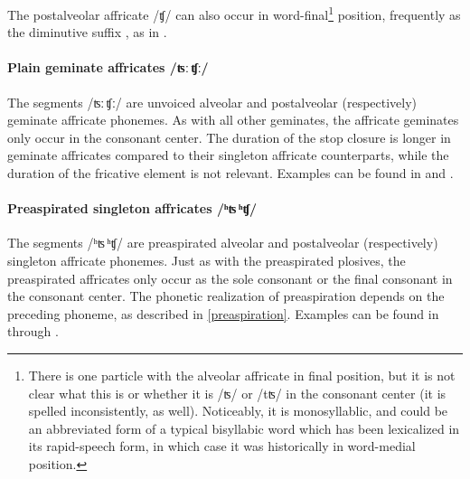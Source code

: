 The postalveolar affricate /ʧ/ can also occur in word-final\footnote{There is one particle  with the alveolar affricate in final position, but it is not clear what this is or whether it is /ʦ/ or /tʦ/ in the consonant center (it is spelled inconsistently, as well). Noticeably, it is monosyllablic, and could be an abbreviated form of a typical bisyllabic word which has been lexicalized in its rapid-speech form, in which case it was historically in word-medial position.} %
position, frequently as the diminutive suffix , as in .

\paragraph{Plain geminate affricates /ʦː\,ʧː/}
The segments /ʦː\,ʧː/ are unvoiced alveolar and postalveolar (respectively) geminate affricate phonemes. As with all other geminates, the affricate geminates only occur in the consonant center. The duration of the stop closure is longer in geminate affricates compared to their singleton affricate counterparts, while the duration of the fricative element is not relevant.
Examples can be found in  and .

\paragraph{Preaspirated singleton affricates /ʰʦ\,ʰʧ/}
The segments \mbox{/ʰʦ\,ʰʧ/} are preaspirated alveolar and postalveolar (respectively) singleton affricate phonemes. Just as with the preaspirated plosives, the preaspirated affricates only occur as the sole consonant or the final consonant in the consonant center. 
The phonetic realization of preaspiration depends on the preceding phoneme, as described in \SEC\ref{preaspiration}. 
Examples can be found in  through .

